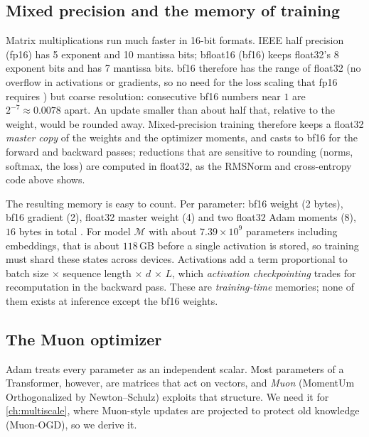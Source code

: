 \subsection{Mixed precision and the memory of training}\label{sec:c01-mixed}

Matrix multiplications run much faster in 16-bit formats. IEEE half precision (fp16) has 5
exponent and 10 mantissa bits; bfloat16 (bf16) \citep{c01-kalamkar2019bf16} keeps float32's
8 exponent bits and has 7 mantissa bits. bf16 therefore has the range of float32 (no
overflow in activations or gradients, so no need for the loss scaling that fp16 requires
\citep{c01-micikevicius2018mixed}) but coarse resolution: consecutive bf16 numbers near $1$
are $2^{-7} \approx 0.0078$ apart. An update smaller than about half that, relative to the
weight, would be rounded away. Mixed-precision training therefore keeps a float32
\emph{master copy} of the weights and the optimizer moments, and casts to bf16 for the
forward and backward passes; reductions that are sensitive to rounding (norms, softmax,
the loss) are computed in float32, as the RMSNorm and cross-entropy code above shows.

The resulting memory is easy to count. Per parameter: bf16 weight (2 bytes), bf16 gradient
(2), float32 master weight (4) and two float32 Adam moments (8), $16$ bytes in total
\citep{c01-rajbhandari2020zero}. For model $\mathcal{M}$ with about $7.39\times 10^9$
parameters including embeddings, that is about $118$\,GB before a single activation is stored,
so training must shard these states across devices. Activations add a term proportional
to batch size $\times$ sequence length $\times$ $d$ $\times$ $L$, which \emph{activation
checkpointing} \citep{c01-chen2016checkpoint} trades for recomputation in the backward pass.
These are \emph{training-time} memories; none of them exists at inference except the bf16
weights.

\subsection{The Muon optimizer}\label{sec:c01-muon}

Adam treats every parameter as an independent scalar. Most parameters of a Transformer,
however, are matrices that act on vectors, and \emph{Muon} (MomentUm Orthogonalized by
Newton--Schulz) \citep{c01-jordan2024muon} exploits that structure. We need it for
\cref{ch:multiscale}, where Muon-style updates are projected to protect old knowledge
(Muon-OGD), so we derive it.

